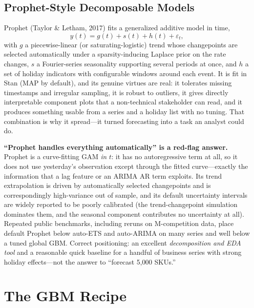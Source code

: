 \subsection{Prophet-Style Decomposable Models}

Prophet (Taylor \& Letham, 2017) fits a generalized additive model in time,
\begin{equation}
y(t) = g(t) + s(t) + h(t) + \varepsilon_t,
\end{equation}
with $g$ a piecewise-linear (or saturating-logistic) trend whose changepoints are selected automatically under a sparsity-inducing Laplace prior on the rate changes, $s$ a Fourier-series seasonality supporting several periods at once, and $h$ a set of holiday indicators with configurable windows around each event. It is fit in Stan (MAP by default), and its genuine virtues are real: it tolerates missing timestamps and irregular sampling, it is robust to outliers, it gives directly interpretable component plots that a non-technical stakeholder can read, and it produces something usable from a series and a holiday list with no tuning. That combination is why it spread---it turned forecasting into a task an analyst could do.

\begin{warningbox}
\textbf{``Prophet handles everything automatically'' is a red-flag answer.} Prophet is a curve-fitting GAM \emph{in $t$}: it has no autoregressive term at all, so it does not use yesterday's observation except through the fitted curve---exactly the information that a lag feature or an ARIMA AR term exploits. Its trend extrapolation is driven by automatically selected changepoints and is correspondingly high-variance out of sample, and its default uncertainty intervals are widely reported to be poorly calibrated (the trend-changepoint simulation dominates them, and the seasonal component contributes no uncertainty at all). Repeated public benchmarks, including reruns on M-competition data, place default Prophet below auto-ETS and auto-ARIMA on many series and well below a tuned global GBM. Correct positioning: an excellent \emph{decomposition and EDA tool} and a reasonable quick baseline for a handful of business series with strong holiday effects---not the answer to ``forecast 5{,}000 SKUs.''
\end{warningbox}

\section{The GBM Recipe}
\label{cml:sec:ts_gbm}

